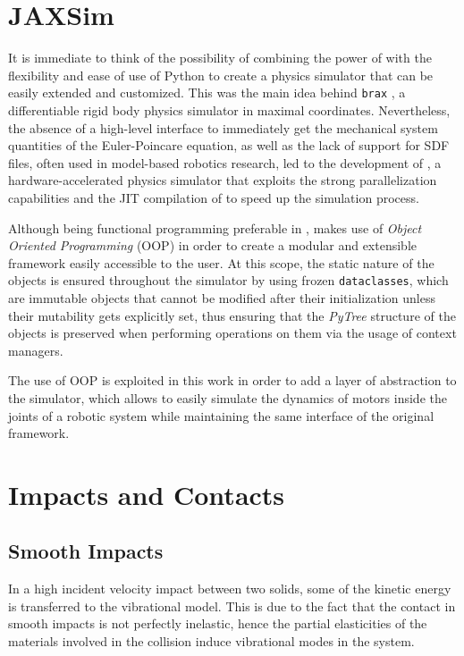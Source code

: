 \section{JAXSim}

It is immediate to think of the possibility of combining the power of \jax with the flexibility and ease of use of Python to create a physics simulator that can be easily extended and customized. This was the main idea behind \texttt{brax} \citep{freeman_brax_2021}, a differentiable rigid body physics simulator in maximal coordinates. Nevertheless, the absence of a high-level interface to immediately get the mechanical system quantities of the Euler-Poincare equation, as well as the lack of support for \ac{SDF} files, often used in model-based robotics research, led to the development of \jaxsim \citep{ferigo_jaxsim_2022}, a hardware-accelerated physics simulator that exploits the strong parallelization capabilities and the \ac{JIT} compilation of \jax to speed up the simulation process.

Although being functional programming preferable in \jax, \jaxsim makes use of \textit{Object Oriented Programming} (\ac{OOP}) in order to create a modular and extensible framework easily accessible to the user. At this scope, the static nature of the objects is ensured throughout the simulator by using frozen \texttt{dataclasses}, which are immutable objects that cannot be modified after their initialization unless their mutability gets explicitly set, thus ensuring that the \textit{PyTree} structure of the objects is preserved when performing operations on them via the usage of context managers.

The use of \ac{OOP} is exploited in this work in order to add a layer of abstraction to the simulator, which allows to easily simulate the dynamics of motors inside the joints of a robotic system while maintaining the same interface of the original \jaxsim framework.


\section{Impacts and Contacts}
\label{sec:back_contacts}
\subsection{Smooth Impacts}

In a high incident velocity impact between two solids, some of the kinetic energy is transferred to the vibrational model. This is due to the fact that the contact in smooth impacts is not perfectly inelastic, hence the partial elasticities of the materials involved in the collision induce vibrational modes in the system.

